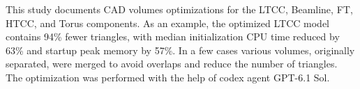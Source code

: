 

\pagestyle{fancy}
\fancyhf{}
\renewcommand{\headrulewidth}{0.4pt}
\renewcommand{\sectionmark}[1]{\markright{\thesection.\ #1}}
\fancyhead[R]{\footnotesize\slshape\rightmark}
\fancyfoot[C]{\small\thepage}
\thispagestyle{plain}
\vspace{18pt}
\vspace{8pt}
\vspace{6pt}
\begin{noteabstract}
This study documents CAD volumes optimizations for the LTCC, Beamline, FT, HTCC, and Torus components.
As an example, the optimized LTCC model contains 94\% fewer triangles, with
median initialization CPU time reduced by 63\% and startup peak memory by 57\%.
In a few cases various volumes, originally separated, were merged to avoid overlaps and reduce the number of triangles.
The optimization was performed with the help of codex agent GPT-6.1 Sol.

\end{noteabstract}
\setcounter{tocdepth}{1}
\tableofcontents
\clearpage




